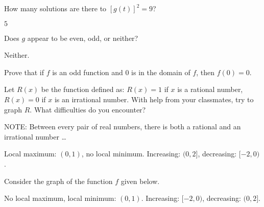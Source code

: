 \documentclass{ximera}
\begin{document}
\begin{question}
How many solutions are there to $[g(t)]^2 = 9$?
\begin{solution}
$5$
\end{solution}

\end{question}

\begin{question}
Does $g$ appear to be even, odd, or neither?

\begin{solution}
Neither.

\end{solution}

\end{question}

\begin{question}
Prove that if $f$ is an odd function and $0$ is in the domain of $f$, then $f(0) = 0$.
\begin{solution}
\end{solution}

\end{question}

\begin{question}
Let $R(x)$ be the function defined as:  $R(x) = 1$ if $x$ is a rational number, $R(x) = 0$ if $x$ is an irrational number. With help from your classmates, try to graph $R$.  What difficulties do you encounter?

NOTE:  Between every pair of real numbers, there is both a rational and an irrational number \ldots


\begin{solution}
Local maximum: $(0,1)$, no local minimum.  Increasing: $(0,2]$, decreasing: $[-2,0)$.
\end{solution}

\end{question}

\begin{question}
Consider the graph of the function $f$ given below.  

\begin{center}

% 


\end{center}

\begin{solution}
No local maximum,  local minimum: $(0,1)$.  Increasing: $[-2,0)$, decreasing: $(0,2]$.
\end{solution}

\end{question}
\end{document}
